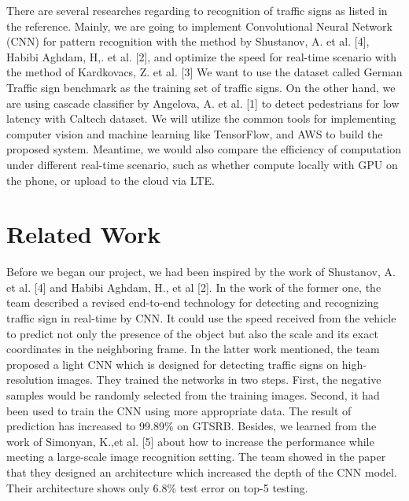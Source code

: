 \documentclass{article}
\begin{document}
There are several researches regarding to recognition of traffic signs as listed in the reference. Mainly, we are going to implement Convolutional Neural Network (CNN) for pattern recognition with the method by Shustanov, A. et al. [4], Habibi Aghdam, H,. et al. [2], and optimize the speed for real-time scenario with the method of Kardkovacs, Z. et al. [3] We want to use the dataset called German Traffic sign benchmark as the training set of traffic signs. On the other hand, we are using cascade classifier by Angelova, A. et al. [1] to detect pedestrians for low latency with Caltech dataset. We will utilize the common tools for implementing computer vision and machine learning like TensorFlow, and AWS to build the proposed system. Meantime, we would also compare the efficiency of computation under different real-time scenario, such as whether compute locally with GPU on the phone, or upload to the cloud via LTE.

\section{Related Work}
Before we began our project, we had been inspired by the work of Shustanov, A. et al. [4] and Habibi Aghdam, H., et al [2]. In the work of the former one, the team described a revised end-to-end technology for detecting and recognizing traffic sign in real-time by CNN. It could use the speed received from the vehicle to predict not only the presence of the object but also the scale and its exact coordinates in the neighboring frame. In the latter work mentioned, the team proposed a light CNN which is designed for detecting traffic signs on high-resolution images. They trained the networks in two steps. First, the negative samples would be randomly selected from the training images. Second, it had been used to train the CNN using more appropriate data. The result of prediction has increased to 99.89\% on GTSRB. Besides, we learned from the work of Simonyan, K.,et al. [5] about how to increase the performance while meeting a large-scale image recognition setting. The team showed in the paper that they designed an architecture which increased the depth of the CNN model. Their architecture shows only 6.8\% test error on top-5 testing. 
\end{document}
